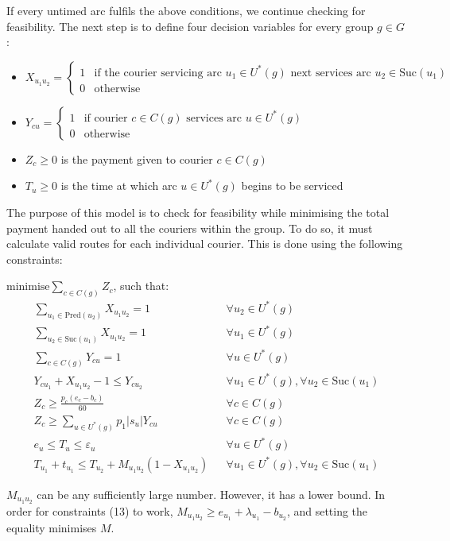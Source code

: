 \documentclass{article}
\newcommand{\Pred}{\text{Pred}}
\newcommand{\Suc}{\text{Suc}}
\begin{document}
If every untimed arc fulfils the above conditions, we continue checking for feasibility. The next step is to define four decision variables for every group $g\in G$:
\begin{itemize}
\item $X_{u_1u_2}=\begin{cases}1&\text{if the courier servicing arc $u_1\in U^*(g)$ next services arc $u_2\in\Suc(u_1)$}\\0&\text{otherwise}\end{cases}$
\item $Y_{cu}=\begin{cases}1&\text{if courier $c\in C(g)$ services arc $u\in U^*(g)$}\\0&\text{otherwise}\end{cases}$
\item $Z_c\geq0$ is the payment given to courier $c\in C(g)$
\item $T_u\geq0$ is the time at which arc $u\in U^*(g)$ begins to be serviced
\end{itemize}

The purpose of this model is to check for feasibility while minimising the total payment handed out to all the couriers within the group. To do so, it must calculate valid routes for each individual courier. This is done using the following constraints:

$\text{minimise}\sum_{c\in C(g)}Z_c$, such that:
\begin{align}
\sum_{u_1\in\Pred(u_2)}X_{u_1u_2}=1&&\forall u_2\in U^*(g)\\
\sum_{u_2\in\Suc(u_1)}X_{u_1u_2}=1&&\forall u_1\in U^*(g)\\
\sum_{c\in C(g)}Y_{cu}=1&&\forall u\in U^*(g)\\
Y_{cu_1}+X_{u_1u_2}-1\leq Y_{cu_2}&&\forall u_1\in U^*(g),\forall u_2\in\Suc(u_1)\\
Z_c\geq\frac{p_c(e_c-b_c)}{60}&&\forall c\in C(g)\\
Z_c\geq\sum_{u\in U^*(g)}p_1|s_u|Y_{cu}&&\forall c\in C(g)\\
e_u\leq T_u\leq\varepsilon_u&&\forall u\in U^*(g)\\
T_{u_1}+t_{u_1}\leq T_{u_2}+M_{u_1u_2}(1-X_{u_1u_2})&&\forall u_1\in U^*(g),\forall u_2\in\Suc(u_1)
\end{align}

$M_{u_1u_2}$ can be any sufficiently large number. However, it has a lower bound. In order for constraints (13) to work, $M_{u_1u_2}\geq e_{u_1}+\lambda_{u_1}-b_{u_2}$, and setting the equality minimises $M$.
\end{document}
